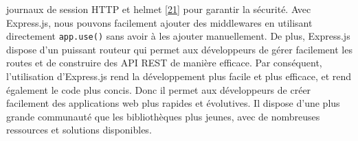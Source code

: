 \documentclass[12pt]{article}
\begin{document}
\begin{itemize}
        journaux de session HTTP et helmet
        \protect\hyperlink{ref-helmet}{{[}21{]}} pour garantir la sécurité.
        Avec Express.js, nous pouvons facilement ajouter des middlewares en
        utilisant directement \texttt{app.use()} sans avoir à les ajouter
        manuellement. De plus, Express.js dispose d'un puissant routeur qui
        permet aux développeurs de gérer facilement les routes et de
        construire des API REST de manière efficace. Par conséquent,
        l'utilisation d'Express.js rend la développement plus facile et plus
        efficace, et rend également le code plus concis. Donc il permet aux
        développeurs de créer facilement des applications web plus rapides et
        évolutives. Il dispose d'une plus grande communauté que les
        bibliothèques plus jeunes, avec de nombreuses ressources et solutions
        disponibles.
\end{itemize}

\newpage
\end{document}
